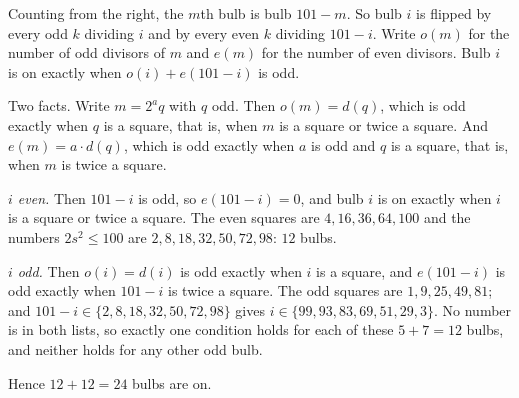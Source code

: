Counting from the right, the $m$th bulb is bulb $101-m$. So bulb $i$ is flipped by every odd $k$ dividing $i$ and by every even $k$ dividing $101-i$. Write $o(m)$ for the number of odd divisors of $m$ and $e(m)$ for the number of even divisors. Bulb $i$ is on exactly when $o(i)+e(101-i)$ is odd.

Two facts. Write $m=2^a q$ with $q$ odd. Then $o(m)=d(q)$, which is odd exactly when $q$ is a square, that is, when $m$ is a square or twice a square. And $e(m)=a\cdot d(q)$, which is odd exactly when $a$ is odd and $q$ is a square, that is, when $m$ is twice a square.

\emph{$i$ even.} Then $101-i$ is odd, so $e(101-i)=0$, and bulb $i$ is on exactly when $i$ is a square or twice a square. The even squares are $4,16,36,64,100$ and the numbers $2s^2\le100$ are $2,8,18,32,50,72,98$: $12$ bulbs.

\emph{$i$ odd.} Then $o(i)=d(i)$ is odd exactly when $i$ is a square, and $e(101-i)$ is odd exactly when $101-i$ is twice a square. The odd squares are $1,9,25,49,81$; and $101-i\in\{2,8,18,32,50,72,98\}$ gives $i\in\{99,93,83,69,51,29,3\}$. No number is in both lists, so exactly one condition holds for each of these $5+7=12$ bulbs, and neither holds for any other odd bulb.

Hence $12+12=\boxed{24}$ bulbs are on.
